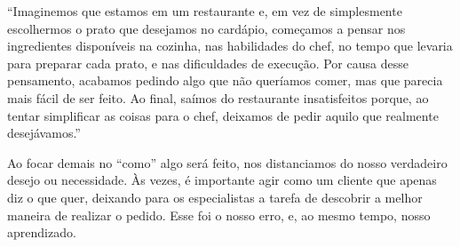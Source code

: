 “Imaginemos que estamos em um restaurante e, em vez de simplesmente escolhermos o prato que desejamos no cardápio, começamos a pensar nos ingredientes disponíveis na cozinha, nas habilidades do chef, no tempo que levaria para preparar cada prato, e nas dificuldades de execução. Por causa desse pensamento, acabamos pedindo algo que não queríamos comer, mas que parecia mais fácil de ser feito. Ao final, saímos do restaurante insatisfeitos porque, ao tentar simplificar as coisas para o chef, deixamos de pedir aquilo que realmente desejávamos.”\par

\originaltab{}Ao focar demais no “como” algo será feito, nos distanciamos do nosso verdadeiro desejo ou necessidade. Às vezes, é importante agir como um cliente que apenas diz o que quer, deixando para os especialistas a tarefa de descobrir a melhor maneira de realizar o pedido. Esse foi o nosso erro, e, ao mesmo tempo, nosso aprendizado.\originalspace{}\par


